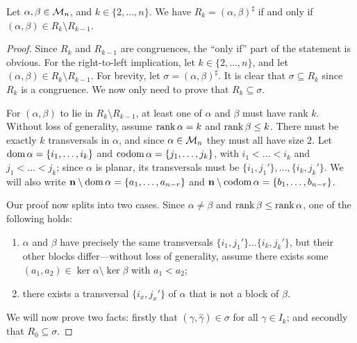 \begin{lemma}
  \label{lem:rees-genpairs}
  Let $\alpha,\beta \in \mathcal{M}_n$, and $k \in \{2, \ldots, n\}$.  We have
  $R_k = (\alpha, \beta)^\sharp$ if and only if
  $(\alpha, \beta) \in R_k \setminus R_{k-1}$.
  \begin{proof}
    Since $R_k$ and $R_{k-1}$ are congruences, the ``only if'' part of the
    statement is obvious.  For the right-to-left implication, let
    $k \in \{2, \ldots, n\}$, and let
    $(\alpha, \beta) \in R_k \setminus R_{k-1}$.  For brevity, let
    $\sigma = (\alpha, \beta)^\sharp$.  It is clear that $\sigma \subseteq R_k$
    since $R_k$ is a congruence.  We now only need to prove that
    $R_k \subseteq \sigma$.

    For $(\alpha, \beta)$ to lie in $R_k \setminus R_{k-1}$, at least one of
    $\alpha$ and $\beta$ must have rank $k$.  Without loss of generality, assume
    $\operatorname{rank}\alpha = k$ and $\operatorname{rank}\beta \leq k$.  There must be exactly $k$
    transversals in $\alpha$, and since $\alpha \in \mathcal{M}_n$ they must all have
    size $2$.  Let $\operatorname{dom}\alpha = \{i_1, \ldots, i_k\}$ and
    $\operatorname{codom}\alpha = \{j_1, \ldots, j_k\}$, with $i_1 < \ldots < i_k$ and
    $j_1 < \ldots < j_k$; since $\alpha$ is planar, its transversals must be
    $\{i_1, j_1'\}, \ldots, \{i_k, j_k'\}$.  We will also write
    $\mathbf{n} \setminus \operatorname{dom}\alpha = \{a_1, \ldots, a_{n-r}\}$ and
    $\mathbf{n} \setminus \operatorname{codom}\alpha = \{b_1, \ldots, b_{n-r}\}$.

    Our proof now splits into two cases.  Since $\alpha \neq \beta$ and
    $\operatorname{rank}\beta \leq \operatorname{rank}\alpha$, one of the following holds:
    \begin{enumerate}[\rm(a)]
    \item $\alpha$ and $\beta$ have precisely the same transversals
      $\{i_1, j_1'\} \ldots \{i_k, j_k'\}$, but their other blocks
      differ---without loss of generality, assume there exists some
      $(a_1,a_2) \in \ker\alpha \setminus \ker\beta$ with $a_1 < a_2$;
    \item there exists a transversal $\{i_x,j_x'\}$ of $\alpha$ that is not a
      block of $\beta$.
    \end{enumerate}
    We will now prove two facts: firstly that
    $(\gamma, \widehat\gamma) \in \sigma$ for all $\gamma \in I_k$; and secondly
    that $R_0 \subseteq \sigma$.


\end{proof}
\end{lemma}
